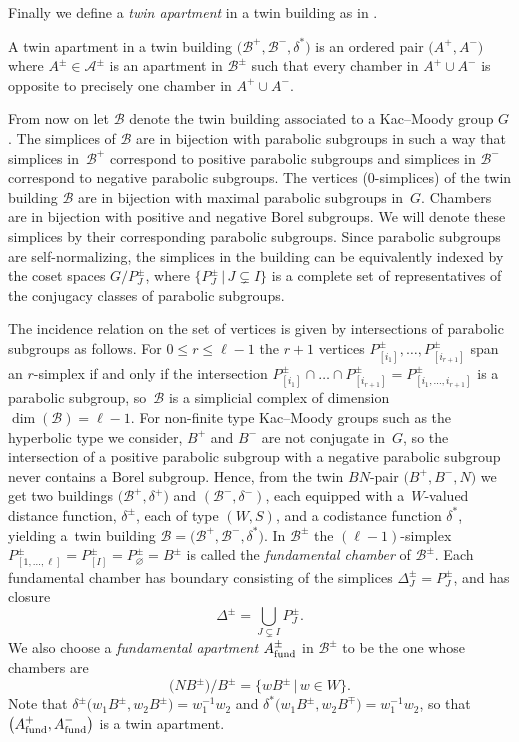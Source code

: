 \documentclass[pdftex]{sigma}
\numberwithin{equation}{section}
\def\cA{\mathcal A}
\def\cB{\mathcal B}
\begin{document}
Finally we define a {\it twin apartment} in a twin building as in \cite[Definition~5.171]{AbramenkoBrown08}.
\begin{Definition}\label{definition:Twin_Apartment}
A twin apartment in a twin building $\big(\cB^+, \cB^-, \delta^*\big)$ is an ordered pair $\big(A^+, A^-\big)$ where $A^\pm\in \cA^\pm$ is an apartment in $\cB^\pm$ such that every chamber in $A^+\cup A^-$ is opposite to precisely one chamber in $A^+\cup A^-$.
\end{Definition}

From now on let $\cB$ denote the twin building associated to a Kac--Moody group $G$.
The simplices of $\cB$ are in bijection with parabolic subgroups in such a way that simplices in~$\cB^+$ correspond to positive parabolic subgroups and simplices in $\cB^-$ correspond to negative parabolic subgroups. The vertices ($0$-simplices) of the twin building $\cB$ are in bijection with maximal parabolic subgroups in~$G$. Chambers are in bijection with positive and negative Borel subgroups.
 We will denote these simplices by their corresponding parabolic subgroups.
Since parabolic subgroups are self-normalizing, the simplices in the building can be equivalently indexed by the coset spaces $G/P_J^\pm$, where $\big\{P_{J}^\pm\, |\, J\subsetneq I\big\}$ is a complete set of representatives of the conjugacy classes of parabolic subgroups.

The incidence relation on the set of vertices is given by intersections of parabolic subgroups as follows. For $0\leq r\leq \ell-1$ the $r+1$ vertices $P_{[i_1]}^\pm,\dots , P_{[i_{r+1}]}^\pm$ span an $r$-simplex if and only if the intersection
$P_{[i_1]}^\pm\cap \dots \cap P_{[i_{r+1}]}^\pm = P_{[i_{1},\dots, i_{r+1}]}^\pm$ is a parabolic subgroup, so~$\cB$ is a simplicial complex of dimension $ \dim(\cB) =\ell -1$.
For non-finite type Kac--Moody groups such as the hyperbolic type we consider, $B^+$ and $B^-$ are not conjugate in~$G$, so the intersection of a positive parabolic subgroup with a negative parabolic subgroup never contains a Borel subgroup.
Hence, from the twin $BN$-pair $\big(B^+,B^-,N\big)$ we get two buildings $\big(\cB^+,\delta^+\big)$ and $(\cB^-,\delta^-)$, each equipped with a~$W$-valued distance function, $\delta^\pm$,
each of type $(W,S)$, and a codistance function $\delta^*$, yielding a~twin building $\cB=\big(\cB^+, \cB^-, \delta^*\big)$. In $\cB^\pm$ the $(\ell-1)$-simplex $P_{[1,\dots, {\ell}]}^\pm = P_{[I]}^\pm = P_\varnothing^\pm = B^\pm$ is called the {\em fundamental chamber} of $\cB^\pm$. Each fundamental chamber has boundary consisting of the simplices $\Delta_J^\pm = P_J^\pm$, and has closure
\[\Delta^\pm = \bigcup_{J\subsetneq I} P_J^\pm.\]
We also choose a {\it fundamental apartment} $A^\pm_{\rm fund}$ in $\cB^\pm$ to be the one whose chambers are
\[\big(NB^\pm\big)/B^\pm = \big\{wB^\pm\,|\, w\in W\big\}.\]
Note that $\delta^\pm\big(w_1B^\pm,w_2B^\pm\big) = w_1^{-1} w_2$ and $\delta^*\big(w_1B^\pm,w_2B^\mp\big) = w_1^{-1} w_2$, so that $\big(A^+_{\rm fund},A^-_{\rm fund}\big)$ is a twin apartment.
\end{document}
